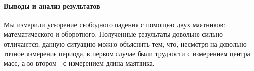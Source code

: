 \documentclass{article}
\begin{document}
\paragraph{Выводы и анализ результатов}
Мы измерили ускорение свободного падения с помощью двух маятников: математического и оборотного. Полученные результаты довольно сильно отличаются, данную ситуацию можно объяснить тем, что, несмотря на довольно точное измерение периода, в первом случае были трудности с измерением центра масс, а во втором - с измерением длина маятника.
\end{document}

